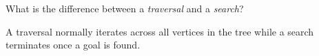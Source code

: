 \question What is the difference between a \emph{traversal} and a
\emph{search}?

\begin{solution}[0.5in]
A traversal normally iterates across all vertices in the tree while a search
terminates once a goal is found.
\end{solution}
